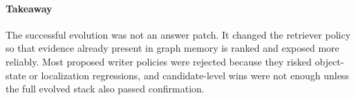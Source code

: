 \paragraph{Takeaway}
The successful evolution was not an answer patch.
It changed the retriever policy so that evidence already present in graph memory is ranked and exposed more reliably.
Most proposed writer policies were rejected because they risked object-state or localization regressions, and candidate-level wins were not enough unless the full evolved stack also passed confirmation.
